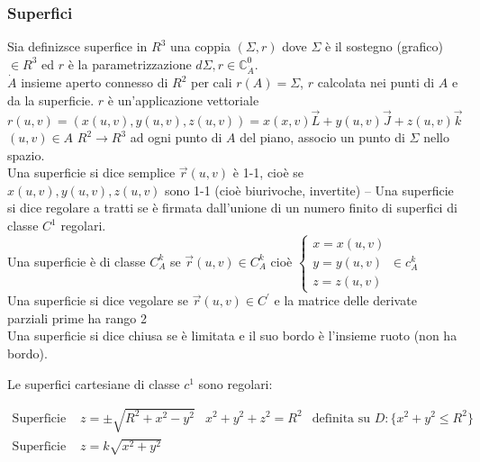 \subsubsection{Superfici}
\begin{defi}
Sia definizsce {\color{red}superfice} in $R^3$ una coppia $(\Sigma, r)$ dove
$\Sigma$ è il sostegno (grafico) $\in R^3$ ed $r$ è la parametrizzazione 
$d\Sigma, r\in\mathds{C}^0_{\dot{A}}.$\\
	$\dot{A}$ insieme aperto connesso di $R^2$ per cali $r(A)=\Sigma$, $r$
	calcolata nei punti di $A$ e da la superficie. $r$ è un'applicazione
	vettoriale
	$r(u,v)=(x(u,v),y(u,v),z(u,v))=x(x,v)\vec{L}+y(u,v)\vec{J}+z(u,v)\vec{k}$
	$(u,v)\in A$ $R^2\to R^3$ ad ogni punto di $A$ del piano, associo un punto
	di $\Sigma$ nello spazio.\\
	Una superficie si dice {\color{red}semplice} $\vec{r}(u,v)$ è 1-1, cioè se
	$x(u,v),y(u,v),z(u,v)$ sono 1-1 (cioè biurivoche, invertite) -- Una
	superficie si dice {\color{red}regolare a tratti} se è firmata dall'unione
	di un numero finito di superfici di classe $C^1$ regolari.\\
	Una superficie è di classe $C^k_A$ se $\vec{r}(u,v)\in C_A^k$ cioè
	$\begin{cases}
		x=x(u,v)\\
		y=y(u,v)\\
		z=z(u,v)
	\end{cases} \in c_A^k$\\
	Una superficie si dice {\color{red}vegolare} se $\vec{r}(u,v)\in C^\prime$
	e la matrice delle derivate parziali prime ha rango 2\\
	Una superficie si dice {\color{red}chiusa} se è limitata e il suo bordo è
	l'insieme ruoto (non ha bordo).
\end{defi}
\begin{teorema}
	Le superfici cartesiane di classe $c^1$ sono regolari:
	\begin{esempio}
		\begin{equation*}
			\begin{matrix}
				\text{Superficie sferica: } &z=\pm\sqrt{R^2+x^2-y^2}&
				x^2+y^2+z^2=R^2 & \text{definita su } D:\{x^2+y^2\leq R^2\}\\
				\text{Superficie corta: } & z=k\sqrt{x^2+y^2}
			\end{matrix}
		\end{equation*}
	\end{esempio}
\end{teorema}
